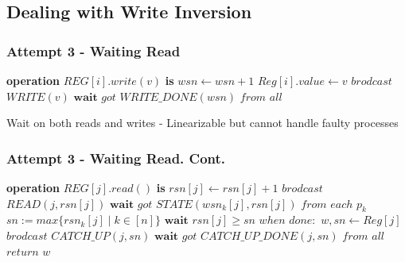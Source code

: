 \subsection{Dealing with Write Inversion}
\begin{frame}[fragile]
    \frametitle{Attempt 3 - Waiting Read}
    \begin{algorithm}[H]
        \begin{algorithmic}[0]
            \STATE \textbf{operation} $REG[i].write(v)$ \textbf{is}
            \bindent
                \STATE $wsn\leftarrow wsn+1$
                \STATE $Reg[i].value \leftarrow v$
                \STATE $brodcast$ $WRITE(v)$
                \STATE $\textbf{wait}$ $got$ $WRITE\_DONE(wsn)$ $from$ $all$
            \eindent
        \end{algorithmic}
        \caption{Wait on both reads and writes -
            Linearizable but cannot handle faulty processes}
    \end{algorithm}
\end{frame}

\begin{frame}[fragile]
    \frametitle{Attempt 3 - Waiting Read. Cont.}
    \begin{algorithm}[H]
        \begin{algorithmic}[0]
            \STATE \textbf{operation} $REG[j].read()$ \textbf{is}
            \bindent
                \STATE $rsn[j]\leftarrow rsn[j]+1$
                \STATE $brodcast$ $READ(j, rsn[j])$
                \STATE $\textbf{wait}$ $got$ $STATE(wsn_k[j], rsn[j])$ $from$ $each$ $p_k$
                \STATE $sn := max\{rsn_k[j]\mid k\in[n]\}$
                \STATE $\textbf{wait}$ $rsn[j] \geq sn$
                \STATE $when$ $done:$ $w, sn \leftarrow Reg[j]$
                \STATE $brodcast$ $CATCH\_UP(j, sn)$
                \STATE $\textbf{wait}$ $got$ $CATCH\_UP\_DONE(j, sn)$ $from$ $all$
                \STATE $return$ $w$
            \eindent
        \end{algorithmic}
        \caption*{}
    \end{algorithm}
\end{frame}

